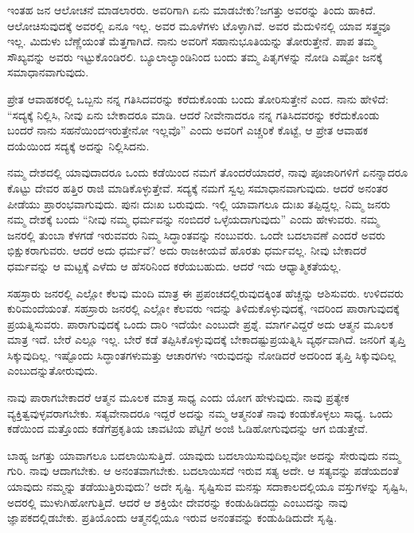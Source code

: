 ಇಂತಹ ಜನ ಆಲೋಚನೆ ಮಾಡಲಾರರು. ಅವರಿಗಾಗಿ ಏನು ಮಾಡಬೇಕು?\break ಜಗತ್ತು ಅವರನ್ನು ತಿಂದು ಹಾಕಿದೆ. ಆಲೋಚಿಸುವುದಕ್ಕೆ ಅವರಲ್ಲಿ ಏನೂ ಇಲ್ಲ. ಅವರ ಮೂಳೆಗಳು ಟೊಳ್ಳಾಗಿವೆ. ಅವರ ಮೆದುಳಿನಲ್ಲಿ ಯಾವ ಸತ್ತ್ವವೂ ಇಲ್ಲ. ಮಿದುಳು ಬೆಣ್ಣೆಯಂತೆ ಮೆತ್ತಗಾಗಿದೆ. ನಾನು ಅವರಿಗೆ ಸಹಾನುಭೂತಿಯನ್ನು ತೋರುತ್ತೇನೆ. ಪಾಪ ತಮ್ಮ ಸೌಖ್ಯವನ್ನು ಅವರು ಇಟ್ಟುಕೊಂಡಿರಲಿ. ಬ್ಯೂಲಾಲ್ಯಾಂಡಿನಿಂದ ಬಂದು ತಮ್ಮ ಪಿತೃಗಳನ್ನು ನೋಡಿ ಎಷ್ಟೋ ಜನಕ್ಕೆ ಸಮಾಧಾನವಾಗುವುದು.

\vskip 6pt

ಪ್ರೇತ ಆವಾಹಕರಲ್ಲಿ ಒಬ್ಬನು ನನ್ನ ಗತಿಸಿದವರನ್ನು ಕರೆದುಕೊಂಡು ಬಂದು ತೋರಿಸುತ್ತೇನೆ ಎಂದ. ನಾನು ಹೇಳಿದೆ: “ಸದ್ಯಕ್ಕೆ ನಿಲ್ಲಿಸಿ, ನೀವು ಏನು ಬೇಕಾದರೂ ಮಾಡಿ. ಆದರೆ ನೀವೇನಾದರೂ ನನ್ನ ಗತಿಸಿದವರನ್ನು ಕರೆದುಕೊಂಡು ಬಂದರೆ ನಾನು ಸಹನೆಯಿಂದ\break ಇರುತ್ತೇನೋ ಇಲ್ಲವೊ” ಎಂದು ಅವರಿಗೆ ಎಚ್ಚರಿಕೆ ಕೊಟ್ಟೆ, ಆ ಪ್ರೇತ ಆವಾಹಕ ದಯೆಯಿಂದ ಸದ್ಯಕ್ಕೆ ಅದನ್ನು ನಿಲ್ಲಿಸಿದನು.

\vskip 6pt

ನಮ್ಮ ದೇಶದಲ್ಲಿ ಯಾವುದಾದರೂ ಒಂದು ಕಡೆಯಿಂದ ನಮಗೆ ತೊಂದರೆಯಾದರೆ, ನಾವು ಪೂಜಾರಿಗಳಿಗೆ ಏನನ್ನಾದರೂ ಕೊಟ್ಟು ದೇವರ ಹತ್ತಿರ ರಾಜಿ ಮಾಡಿಕೊಳ್ಳುತ್ತೇವೆ. ಸದ್ಯಕ್ಕೆ ನಮಗೆ ಸ್ವಲ್ಪ ಸಮಾಧಾನವಾಗುವುದು. ಆದರೆ ಅನಂತರ ಪೀಡೆಯು ಪ್ರಾರಂಭವಾಗುವುದು. ಪುನಃ ದುಃಖ ಬರುವುದು. ಇಲ್ಲಿ ಯಾವಾಗಲೂ ದುಃಖ ತಪ್ಪಿದ್ದಲ್ಲ. ನಿಮ್ಮ ಜನರು ನಮ್ಮ ದೇಶಕ್ಕೆ ಬಂದು “ನೀವು ನಮ್ಮ ಧರ್ಮವನ್ನು ನಂಬಿದರೆ ಒಳ್ಳೆಯದಾಗುವುದು” ಎಂದು ಹೇಳುವರು. ನಮ್ಮ ಜನರಲ್ಲಿ ತುಂಬಾ ಕೆಳಗಡೆ ಇರುವವರು ನಿಮ್ಮ ಸಿದ್ಧಾಂತವನ್ನು ನಂಬುವರು. ಒಂದೇ ಬದಲಾವಣೆ ಎಂದರೆ ಅವರು ಭಿಕ್ಷುಕರಾಗುವರು. ಆದರೆ ಅದು ಧರ್ಮವೆ? ಅದು ರಾಜಕೀಯವೆ ಹೊರತು ಧರ್ಮವಲ್ಲ. ನೀವು ಬೇಕಾದರೆ ಧರ್ಮವನ್ನು ಆ ಮಟ್ಟಕ್ಕೆ ಎಳೆದು ಆ ಹೆಸರಿನಿಂದ ಕರೆಯಬಹುದು. ಆದರೆ ಇದು ಆಧ್ಯಾತ್ಮಿಕತೆಯಲ್ಲ.

\vskip 6pt

ಸಹಸ್ರಾರು ಜನರಲ್ಲಿ ಎಲ್ಲೋ ಕೆಲವು ಮಂದಿ ಮಾತ್ರ ಈ ಪ್ರಪಂಚದಲ್ಲಿರುವುದಕ್ಕಿಂತ ಹೆಚ್ಚನ್ನು ಆಶಿಸುವರು. ಉಳಿದವರು ಕುರಿಮಂದೆಯಂತೆ. ಸಹಸ್ರಾರು ಜನರಲ್ಲಿ ಎಲ್ಲೋ ಕೆಲವರು ಇದನ್ನು ತಿಳಿದುಕೊಳ್ಳುವುದಕ್ಕೆ, ಇದರಿಂದ ಪಾರಾಗುವುದಕ್ಕೆ ಪ್ರಯತ್ನಿಸುವರು. ಪಾರಾಗುವುದಕ್ಕೆ ಒಂದು ದಾರಿ ಇದೆಯೇ ಎಂಬುದೇ ಪ್ರಶ್ನೆ. ಮಾರ್ಗವಿದ್ದರೆ ಅದು ಆತ್ಮನ ಮೂಲಕ ಮಾತ್ರ ಇದೆ. ಬೇರೆ ಎಲ್ಲೂ ಇಲ್ಲ. ಬೇರೆ ಕಡೆ ತಪ್ಪಿಸಿಕೊಳ್ಳುವುದಕ್ಕೆ ಬೇಕಾದಷ್ಟು\break ಪ್ರಯತ್ನಿಸಿ ವ್ಯರ್ಥವಾಗಿದೆ. ಜನರಿಗೆ ತೃಪ್ತಿ ಸಿಕ್ಕುವುದಿಲ್ಲ. ಇಷ್ಟೊಂದು ಸಿದ್ಧಾಂತಗಳು\break ಮತ್ತು ಆಚಾರಗಳು ಇರುವುದನ್ನು ನೋಡಿದರೆ ಅದರಿಂದ ತೃಪ್ತಿ ಸಿಕ್ಕುವುದಿಲ್ಲ ಎಂಬುದನ್ನು\break ತೋರುವುದು.

\vskip 6pt

ನಾವು ಪಾರಾಗಬೇಕಾದರೆ ಆತ್ಮನ ಮೂಲಕ ಮಾತ್ರ ಸಾಧ್ಯ ಎಂದು ಯೋಗ ಹೇಳುವುದು. ನಾವು ಪ್ರತ್ಯೇಕ ವ್ಯಕ್ತಿತ್ವವುಳ್ಳವರಾಗಬೇಕು. ಸತ್ಯವೇನಾದರೂ ಇದ್ದರೆ ಅದನ್ನು ನಮ್ಮ ಆತ್ಮನಂತೆ ನಾವು ಕಂಡುಕೊಳ್ಳಲು ಸಾಧ್ಯ. ಒಂದು ಕಡೆಯಿಂದ ಮತ್ತೊಂದು ಕಡೆಗೆ\break ಪ್ರಕೃತಿಯ ಚಾವಟಿಯ ಪೆಟ್ಟಿಗೆ ಅಂಜಿ ಓಡಿಹೋಗುವುದನ್ನು ಆಗ ಬಿಡುತ್ತೇವೆ.

\vskip 6pt

ಬಾಹ್ಯ ಜಗತ್ತು ಯಾವಾಗಲೂ ಬದಲಾಯಿಸುತ್ತಿದೆ. ಯಾವುದು ಬದಲಾಯಿಸುವುದಿಲ್ಲವೋ ಅದನ್ನು ಸೇರುವುದು ನಮ್ಮ ಗುರಿ. ನಾವು ಆದಾಗಬೇಕು. ಆ ಅನಂತವಾಗಬೇಕು. ಬದಲಾಯಿಸದೆ ಇರುವ ಸತ್ಯ ಅದೇ. ಆ ಸತ್ಯವನ್ನು ಪಡೆಯದಂತೆ ಯಾವುದು ನಮ್ಮನ್ನು ತಡೆಯುತ್ತಿರುವುದು? ಅದೇ ಸೃಷ್ಟಿ. ಸೃಷ್ಟಿಸುವ ಮನಸ್ಸು ಸದಾಕಾಲದಲ್ಲಿಯೂ ವಸ್ತುಗಳನ್ನು ಸೃಷ್ಟಿಸಿ, ಅದರಲ್ಲಿ ಮುಳುಗಿಹೋಗುತ್ತಿದೆ. ಆದರೆ ಆ ಶಕ್ತಿಯೇ ದೇವರನ್ನು ಕಂಡುಹಿಡಿದದ್ದು ಎಂಬುದನ್ನು ನಾವು ಜ್ಞಾಪಕದಲ್ಲಿಡಬೇಕು. ಪ್ರತಿಯೊಂದು ಆತ್ಮನಲ್ಲಿಯೂ ಇರುವ ಅನಂತವನ್ನು ಕಂಡುಹಿಡಿದುದೇ ಸೃಷ್ಟಿ.


